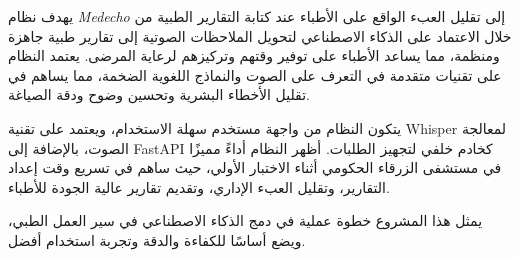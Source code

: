 \begin{otherlanguage}{arabic}
يهدف نظام \textit{Medecho} إلى تقليل العبء الواقع على الأطباء عند كتابة التقارير الطبية 
من خلال الاعتماد على الذكاء الاصطناعي لتحويل الملاحظات الصوتية إلى تقارير طبية جاهزة 
ومنظمة، مما يساعد الأطباء على توفير وقتهم وتركيزهم لرعاية المرضى. يعتمد النظام على 
تقنيات متقدمة في التعرف على الصوت والنماذج اللغوية الضخمة، مما يساهم في تقليل الأخطاء 
البشرية وتحسين وضوح ودقة الصياغة.

يتكون النظام من واجهة مستخدم سهلة الاستخدام، ويعتمد على تقنية Whisper لمعالجة الصوت، 
بالإضافة إلى FastAPI كخادم خلفي لتجهيز الطلبات. أظهر النظام أداءً مميزًا في مستشفى 
الزرقاء الحكومي أثناء الاختبار الأولي، حيث ساهم في تسريع وقت إعداد التقارير، وتقليل 
العبء الإداري، وتقديم تقارير عالية الجودة للأطباء.

يمثل هذا المشروع خطوة عملية في دمج الذكاء الاصطناعي في سير العمل الطبي، ويضع أساسًا 
للكفاءة والدقة وتجربة استخدام أفضل.
\end{otherlanguage}
